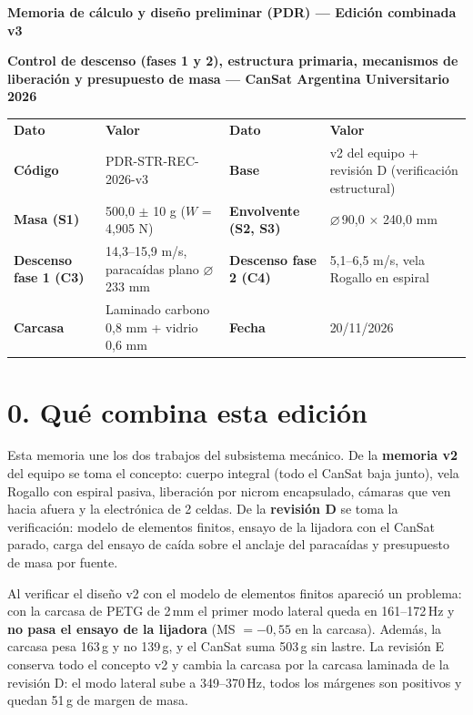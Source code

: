 \documentclass[10pt,a4paper]{article}
\newcommand{\diam}{\ensuremath{\varnothing}}
\begin{document}
\begin{tcolorbox}[colback=celeste,colframe=azul,boxrule=0.6pt,arc=0pt]
{\large\bfseries\color{azul} Memoria de cálculo y diseño preliminar (PDR) --- Edición combinada v3\par}\smallskip
{\bfseries Control de descenso (fases 1 y 2), estructura primaria, mecanismos de liberación y presupuesto de masa ---
CanSat Argentina Universitario 2026\par}
\end{tcolorbox}
\par{\small\noindent\begin{tabularx}{\linewidth}{P{3.0cm}LP{3.0cm}L}
\color{white}\bfseries Dato & \color{white}\bfseries Valor & \color{white}\bfseries Dato & \color{white}\bfseries Valor \\
\bfseries Código & PDR-STR-REC-2026-v3 & \bfseries Base & v2 del equipo + revisión D (verificación estructural) \\
\bfseries Masa (S1) & 500,0 $\pm$ 10 g ($W$ = 4,905 N) & \bfseries Envolvente (S2, S3) & \diam\,90,0 $\times$ 240,0 mm \\
\bfseries Descenso fase 1 (C3) & 14,3--15,9 m/s, paracaídas plano \diam233 mm & \bfseries Descenso fase 2 (C4) & 5,1--6,5 m/s, vela Rogallo en espiral \\
\bfseries Carcasa & Laminado carbono 0,8 mm + vidrio 0,6 mm & \bfseries Fecha & 20/11/2026 \\
\end{tabularx}}
\par\medskip
\section*{0. Qué combina esta edición}
Esta memoria une los dos trabajos del subsistema mecánico. De la \textbf{memoria v2} del equipo se toma el concepto: cuerpo
integral (todo el CanSat baja junto), vela Rogallo con espiral pasiva, liberación por nicrom encapsulado, cámaras que ven hacia
afuera y la electrónica de 2 celdas. De la \textbf{revisión D} se toma la verificación: modelo de elementos finitos, ensayo de la
lijadora con el CanSat parado, carga del ensayo de caída sobre el anclaje del paracaídas y presupuesto de masa por fuente.

Al verificar el diseño v2 con el modelo de elementos finitos apareció un problema: con la carcasa de PETG de 2\,mm el primer modo
lateral queda en 161--172\,Hz y \textbf{no pasa el ensayo de la lijadora} (MS $= -0{,}55$ en la carcasa). Además, la carcasa pesa
163\,g y no 139\,g, y el CanSat suma 503\,g sin lastre. La revisión E conserva todo el concepto v2 y cambia la carcasa por la
carcasa laminada de la revisión D: el modo lateral sube a 349--370\,Hz, todos los márgenes son positivos y quedan 51\,g de margen
de masa.
\end{document}
